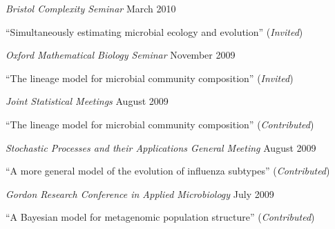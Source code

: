\documentclass[10pt]{article}
\newenvironment{outerlist}[1][\enskip\textbullet]%
        {\begin{itemize}[#1]}{\end{itemize}%
         \vspace{-.6\baselineskip}}
\newenvironment{innerlist}[1][\enskip\textbullet]%
        {\begin{compactitem}[#1]}{\end{compactitem}}
\begin{document}
\begin{outerlist}
\item[] \textit{Bristol Complexity Seminar}%
        \hfill {March 2010}
\begin{innerlist}
\item ``Simultaneously estimating microbial ecology and evolution''  (\emph{Invited})
\end{innerlist}
\end{outerlist} 

\begin{outerlist}
\item[] \textit{Oxford Mathematical Biology Seminar}%
        \hfill {November 2009}
\begin{innerlist}
\item ``The lineage model for microbial community composition''  (\emph{Invited})
\end{innerlist}
\end{outerlist} 


\begin{outerlist}
\item[] \textit{Joint Statistical Meetings}%
        \hfill {August 2009}
\begin{innerlist}
\item ``The lineage model for microbial community composition''  (\emph{Contributed})
\end{innerlist}
\end{outerlist} 


\begin{outerlist}
\item[] \textit{Stochastic Processes and their Applications General Meeting }%
        \hfill {August 2009}
\begin{innerlist}
\item ``A more general model of the evolution of influenza subtypes''  (\emph{Contributed})
\end{innerlist}
\end{outerlist} 

\begin{outerlist}
\item[] \textit{Gordon Research Conference in Applied Microbiology}%
        \hfill {July 2009}
\begin{innerlist}
\item ``A Bayesian model for metagenomic population structure''  (\emph{Contributed})
\end{innerlist}
\end{outerlist} 
\end{document}
